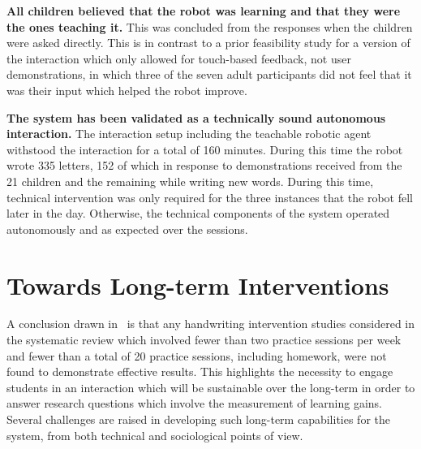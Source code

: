 \documentclass{sig-alternate}
\begin{document}
    \textbf{All children believed that the robot was learning and that
        they were the ones teaching it.} This was concluded from the responses
        when the children were asked directly. This is in contrast to a prior
        feasibility study for a version of the interaction which only allowed
        for touch-based feedback, not user demonstrations, in which three of the
        seven adult participants did not feel that it was their input which
        helped the robot improve.



    \textbf{The system has been validated as a technically sound
        autonomous interaction.} The interaction setup including the teachable
        robotic agent withstood the interaction for a total of 160 minutes. During this
        time the robot wrote 335 letters, 152 of which in response to
        demonstrations received from the 21 children and the remaining while writing 
        new words. During this time, technical 
	intervention was only required for the three instances that the robot fell 
	later in the day. Otherwise, the technical components of the system operated 
	autonomously and as expected over the sessions.




\section{Towards Long-term Interventions}\label{sec:futureWork}

A conclusion drawn in~\cite{Hoy2011} is that any 
handwriting intervention studies considered in the systematic review which involved 
fewer than two practice sessions per week and fewer than a total of 20 practice 
sessions, including homework, were not found to demonstrate effective results. This 
highlights the necessity to engage students in an interaction which will be sustainable
 over the long-term in order to answer 
research questions which involve the measurement of learning gains. 
Several challenges are raised in developing such long-term capabilities for the system,
 from both technical and sociological points of view. %
\end{document}
